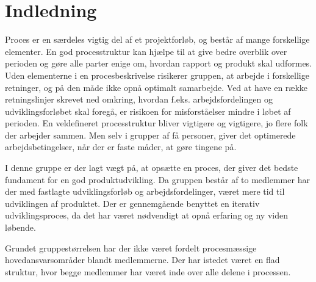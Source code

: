 \chapter{Indledning}
Proces er en særdeles vigtig del af et projektforløb, og består af mange forskellige elementer. En god processtruktur kan hjælpe til at give bedre overblik over perioden og gøre alle parter enige om, hvordan rapport og produkt skal udformes. Uden elementerne i en procesbeskrivelse risikerer gruppen, at arbejde i forskellige retninger, og på den måde ikke opnå optimalt samarbejde. Ved at have en række retningslinjer skrevet ned omkring, hvordan f.eks. arbejdsfordelingen og udviklingsforløbet skal foregå, er risikoen for misforståelser mindre i løbet af perioden. En veldefineret processtruktur bliver vigtigere og vigtigere, jo flere folk der arbejder sammen. Men selv i grupper af få personer, giver det optimerede arbejdsbetingelser, når der er faste måder, at gøre tingene på.  

I denne gruppe er der lagt vægt på, at opsætte en proces, der giver det bedste fundament for en god produktudvikling. Da gruppen består af to medlemmer har der med fastlagte udviklingsforløb og arbejdsfordelinger, været mere tid til udviklingen af produktet. Der er gennemgående benyttet en iterativ udviklingsproces, da det har været nødvendigt at opnå erfaring og ny viden løbende. 

Grundet gruppestørrelsen har der ikke været fordelt procesmæssige hovedansvarsområder blandt medlemmerne. Der har istedet været en flad struktur, hvor begge medlemmer har været inde over alle delene i processen.   